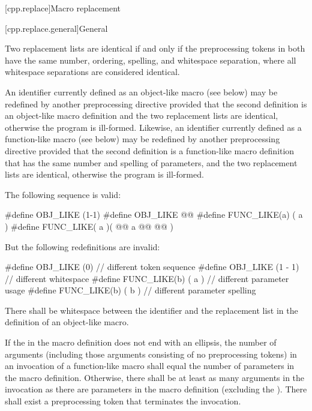 [cpp.replace]{Macro replacement}%

[cpp.replace.general]{General}%
%
%

\pnum
{}%
Two replacement lists are identical if and only if
the preprocessing tokens in both have
the same number, ordering, spelling, and whitespace separation,
where all whitespace separations are considered identical.

\pnum
An identifier currently defined as an
%
object-like macro (see below) may be redefined by another
preprocessing directive provided that the second definition is an
object-like macro definition and the two replacement lists
are identical, otherwise the program is ill-formed.
Likewise, an identifier currently defined as a
%
function-like macro (see below) may be redefined by another
preprocessing directive provided that the second definition is a
function-like macro definition that has the same number and spelling
of parameters,
and the two replacement lists are identical,
otherwise the program is ill-formed.

\pnum
\begin{example}
The following sequence is valid:
\begin{codeblock}
#define OBJ_LIKE      (1-1)
#define OBJ_LIKE      @@
#define FUNC_LIKE(a)   ( a )
#define FUNC_LIKE( a )(     @@
                a @@
                  @\tcode{*/}@ )
\end{codeblock}
But the following redefinitions are invalid:
\begin{codeblock}
#define OBJ_LIKE    (0)         // different token sequence
#define OBJ_LIKE    (1 - 1)     // different whitespace
#define FUNC_LIKE(b) ( a )      // different parameter usage
#define FUNC_LIKE(b) ( b )      // different parameter spelling
\end{codeblock}
\end{example}

\pnum
{}%
There shall be whitespace between the identifier and the replacement list
in the definition of an object-like macro.

\pnum
If the  in the macro definition does not end with
an ellipsis, the number of arguments (including those arguments consisting
of no preprocessing tokens)
in an invocation of a function-like macro shall
equal the number of parameters in the macro definition.
Otherwise, there shall be at least as many arguments in the invocation as there are
parameters in the macro definition (excluding the ). There
shall exist a
\tcode{)}
preprocessing token that terminates the invocation.

